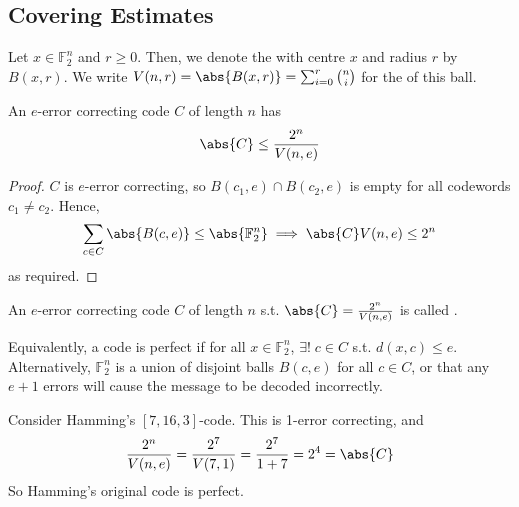 \subsection{Covering Estimates}
\begin{definition}
    Let $x \in \mathbb F_2^n$ and $r \geq 0$.
    Then, we denote the  with centre $x$ and radius $r$ by $B(x,r)$.
    We write $V(n,r) = \abs{B(x,r)} = \sum_{i=0}^r \binom{n}{i}$ for the  of this ball.
\end{definition}

\begin{lemma}
    An $e$-error correcting code $C$ of length $n$ has
    \begin{align*}
        \abs{C} \leq \frac{2^n}{V(n,e)}
    \end{align*}
\end{lemma}

\begin{proof}
    $C$ is $e$-error correcting, so $B(c_1, e) \cap B(c_2, e)$ is empty for all codewords $c_1 \neq c_2$.
    Hence,
    \begin{align*}
        \sum_{c \in C} \abs{B(c,e)}  \leq \abs{\mathbb F_2^n} \implies \abs{C} V(n,e) \leq 2^n
    \end{align*}
    as required.
\end{proof}

\begin{definition}
    An $e$-error correcting code $C$ of length $n$ s.t. $\abs{C} = \frac{2^n}{V(n,e)}$ is called .
\end{definition}

\begin{remark}
    Equivalently, a code is perfect if for all $x \in \mathbb F_2^n$, $\exists! \; c \in C$ s.t. $d(x,c) \leq e$.
    Alternatively, $\mathbb F_2^n$ is a union of disjoint balls $B(c,e)$ for all $c \in C$, or that any $e + 1$ errors will cause the message to be decoded incorrectly.
\end{remark}

\begin{example}
    Consider Hamming's $[7,16,3]$-code.
    This is 1-error correcting, and
    \begin{align*}
        \frac{2^n}{V(n,e)} = \frac{2^7}{V(7,1)} = \frac{2^7}{1+7} = 2^4 = \abs{C}
    \end{align*}
    So Hamming's original code is perfect.
\end{example}

